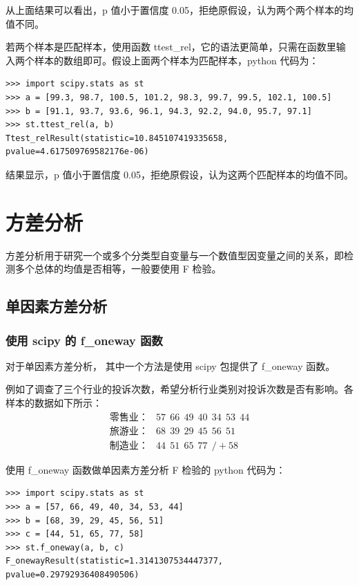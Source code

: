从上面结果可以看出，p 值小于置信度 0.05，拒绝原假设，认为两个两个样本的均值不同。

若两个样本是匹配样本，使用函数 ttest\_rel，它的语法更简单，只需在函数里输入两个样本的数组即可。假设上面两个样本为匹配样本，python 代码为：

\begin{lstlisting}[Language=Python]
>>> import scipy.stats as st
>>> a = [99.3, 98.7, 100.5, 101.2, 98.3, 99.7, 99.5, 102.1, 100.5]
>>> b = [91.1, 93.7, 93.6, 96.1, 94.3, 92.2, 94.0, 95.7, 97.1]
>>> st.ttest_rel(a, b)
Ttest_relResult(statistic=10.845107419335658, pvalue=4.617509769582176e-06)
\end{lstlisting}

结果显示，p 值小于置信度 0.05，拒绝原假设，认为这两个匹配样本的均值不同。

\chapter{方差分析}

方差分析用于研究一个或多个分类型自变量与一个数值型因变量之间的关系，即检测多个总体的均值是否相等，一般要使用 F 检验。

\section{单因素方差分析}

\subsection{使用 scipy 的 f\_oneway 函数}
对于单因素方差分析， 其中一个方法是使用 scipy 包提供了 f\_oneway 函数。

例如了调查了三个行业的投诉次数，希望分析行业类别对投诉次数是否有影响。各样本的数据如下所示：
\begin{align}
  \text{零售业：}&57~~ 66~~ 49~~ 40~~ 34~~ 53~~ 44\nonumber\\
  \text{旅游业：}&68~~ 39~~ 29~~ 45~~ 56~~ 51\nonumber\\
  \text{制造业：}&44~~ 51~~ 65~~ 77~~/+ 58\nonumber
\end{align}

使用 f\_oneway 函数做单因素方差分析 F 检验的 python 代码为：

\begin{lstlisting}[Language=Python]
>>> import scipy.stats as st
>>> a = [57, 66, 49, 40, 34, 53, 44]
>>> b = [68, 39, 29, 45, 56, 51]
>>> c = [44, 51, 65, 77, 58]
>>> st.f_oneway(a, b, c)
F_onewayResult(statistic=1.3141307534447377, pvalue=0.29792936408490506)
\end{lstlisting}

